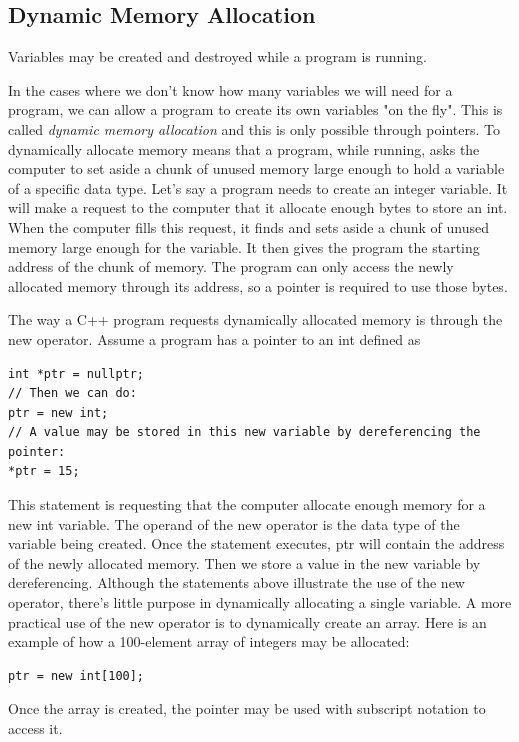 \documentclass{report}
\begin{document}
    \bigbreak \noindent 
    \subsection{Dynamic Memory Allocation}
    \bigbreak \noindent 
    \begin{concept}
 Variables may be created and destroyed while a program is running.
	\end{concept}
    \bigbreak \noindent 
    In the cases where we don't know how many variables we will need for a program, we can allow a program to create its own variables "on the fly". This is called \textit{dynamic memory allocation} and this is only possible through pointers.
    \bigbreak \noindent 
    To dynamically allocate memory means that a program, while running, asks the computer
to set aside a chunk of unused memory large enough to hold a variable of a specific data
type. Let’s say a program needs to create an integer variable. It will make a request to the
computer that it allocate enough bytes to store an int. When the computer fills this request,
it finds and sets aside a chunk of unused memory large enough for the variable. It then gives
the program the starting address of the chunk of memory. The program can only access the
newly allocated memory through its address, so a pointer is required to use those bytes.

    \bigbreak \noindent 
    The way a C++ program requests dynamically allocated memory is through the new operator. Assume a program has a pointer to an int defined as
    \bigbreak \noindent 
    \sepline
    \begin{verbatim}
int *ptr = nullptr;
// Then we can do:
ptr = new int;
// A value may be stored in this new variable by dereferencing the pointer:
*ptr = 15;
    \end{verbatim}
    \sepline

    \bigbreak \noindent 
    This statement is requesting that the computer allocate enough memory for a new int variable. The operand of the new operator is the data type of the variable being created. Once the statement executes, ptr will contain the address of the newly allocated memory. Then we store a value in the new variable by dereferencing.
    \bigbreak \noindent 
    Although the statements above illustrate the use of the new operator, there’s little purpose
in dynamically allocating a single variable. A more practical use of the new operator is to
dynamically create an array. Here is an example of how a 100-element array of integers
may be allocated:
\bigbreak \noindent 
\sepline
\begin{verbatim}
ptr = new int[100];
\end{verbatim}
\sepline
\bigbreak \noindent 
    Once the array is created, the pointer may be used with subscript notation to access it. 
\end{document}

